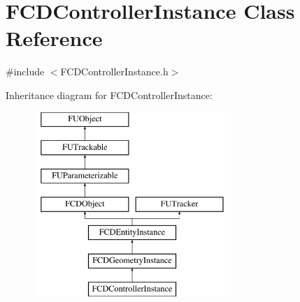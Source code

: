 \hypertarget{classFCDControllerInstance}{
\section{FCDControllerInstance Class Reference}
\label{classFCDControllerInstance}
}


{\ttfamily \#include $<$FCDControllerInstance.h$>$}

Inheritance diagram for FCDControllerInstance:\begin{figure}[H]
\begin{center}
\leavevmode
\includegraphics[height=7.000000cm]{classFCDControllerInstance}
\end{center}
\end{figure}
